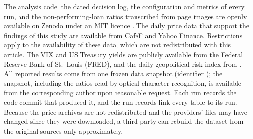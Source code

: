 The analysis code, the dated decision log, the configuration and metrics of every run, and the
non-performing-loan ratios transcribed from page images are openly available on Zenodo under an MIT
licence \citep{LuuPhamNgo2026Code}. The daily price data that support the findings of this study
are available from CafeF and Yahoo Finance. Restrictions apply to the availability of these data,
which are not redistributed with this article. The VIX and US Treasury yields are publicly
available from the Federal Reserve Bank of St.\ Louis (FRED), and the daily geopolitical risk index
from \citet{CaldaraIacoviello2022}. All reported results come from one frozen data snapshot
(identifier ); the snapshot, including the ratios read by optical character
recognition, is available from the corresponding author upon reasonable request. Each run records
the code commit that produced it, and the run records link every table to its run. Because
the price archives are not redistributed and the providers' files may have changed since they were
downloaded, a third party can rebuild the dataset from the original sources only approximately.
